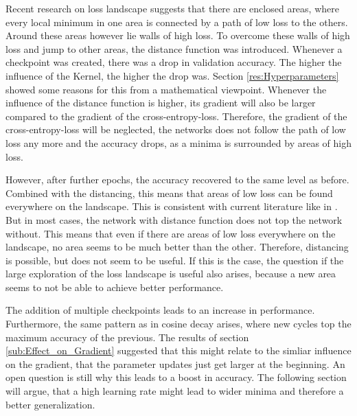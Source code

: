 Recent research on loss landscape suggests that there are enclosed areas, where
every local minimum in one area is connected by a path of low loss to the
others. Around these areas however lie walls of high loss. To overcome these
walls of high loss and jump to other areas, the distance function was
introduced. Whenever a checkpoint was created, there was a drop in validation
accuracy. The higher the influence of the Kernel, the higher the drop was.
Section \ref{res:Hyperparameters} showed some reasons for this from a
mathematical viewpoint. Whenever the influence of the distance function is
higher, its gradient will also be larger compared to the gradient of the
cross-entropy-loss. Therefore, the gradient of the cross-entropy-loss will be
neglected, the networks does not follow the path of low loss any more and the
accuracy drops, as a minima is surrounded by areas of high loss.

However, after further epochs, the accuracy recovered to the same level as
before. Combined with the distancing, this means that areas of low loss can be
found everywhere on the landscape. This is consistent with current literature
like in \cite{he2020piecewise}. But in most cases, the network with distance
function does not top the network without. This means that even if there are
areas of low loss everywhere on the landscape, no area seems to be much better
than the other. Therefore, distancing is possible, but does not seem to be
useful. If this is the case, the question if the large exploration of the loss
landscape is useful also arises, because a new area seems to not be able to
achieve better performance. 
\newline

The addition of multiple checkpoints leads to an increase in performance.
Furthermore, the same pattern as in cosine decay arises, where new cycles top
the maximum accuracy of the previous. The results of section
\ref{sub:Effect_on_Gradient} suggested that this might relate to the simliar
influence on the gradient, that the parameter updates just get larger at the
beginning. An open question is still why this leads to a boost in accuracy. The
following section will argue, that a high learning rate might lead to wider
minima and therefore a better generalization.

